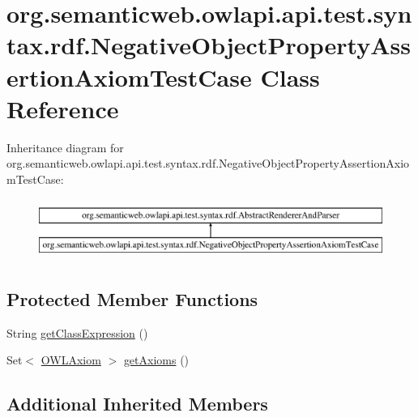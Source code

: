 \hypertarget{classorg_1_1semanticweb_1_1owlapi_1_1api_1_1test_1_1syntax_1_1rdf_1_1_negative_object_property_assertion_axiom_test_case}{\section{org.\-semanticweb.\-owlapi.\-api.\-test.\-syntax.\-rdf.\-Negative\-Object\-Property\-Assertion\-Axiom\-Test\-Case Class Reference}
\label{classorg_1_1semanticweb_1_1owlapi_1_1api_1_1test_1_1syntax_1_1rdf_1_1_negative_object_property_assertion_axiom_test_case}
}
Inheritance diagram for org.\-semanticweb.\-owlapi.\-api.\-test.\-syntax.\-rdf.\-Negative\-Object\-Property\-Assertion\-Axiom\-Test\-Case\-:\begin{figure}[H]
\begin{center}
\leavevmode
\includegraphics[height=2.000000cm]{classorg_1_1semanticweb_1_1owlapi_1_1api_1_1test_1_1syntax_1_1rdf_1_1_negative_object_property_assertion_axiom_test_case}
\end{center}
\end{figure}
\subsection*{Protected Member Functions}
\begin{DoxyCompactItemize}
\item 
String \hyperlink{classorg_1_1semanticweb_1_1owlapi_1_1api_1_1test_1_1syntax_1_1rdf_1_1_negative_object_property_assertion_axiom_test_case_a9521665d2f2fe258c96059006fbd65f4}{get\-Class\-Expression} ()
\item 
Set$<$ \hyperlink{interfaceorg_1_1semanticweb_1_1owlapi_1_1model_1_1_o_w_l_axiom}{O\-W\-L\-Axiom} $>$ \hyperlink{classorg_1_1semanticweb_1_1owlapi_1_1api_1_1test_1_1syntax_1_1rdf_1_1_negative_object_property_assertion_axiom_test_case_a85d1406ec57bf5495d87b59c2465facb}{get\-Axioms} ()
\end{DoxyCompactItemize}
\subsection*{Additional Inherited Members}


